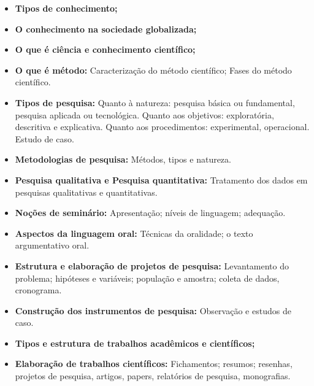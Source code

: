 \begin{itemize}

\item \textbf{Tipos de conhecimento;}

\item \textbf{O conhecimento na sociedade globalizada;}

\item \textbf{O que é ciência e conhecimento científico;}

\item \textbf{O que é método:} 
Caracterização do método científico; Fases do método científico.

\item \textbf{Tipos de pesquisa:}
Quanto à natureza: pesquisa básica ou fundamental, pesquisa aplicada ou tecnológica. Quanto aos objetivos: exploratória, descritiva e explicativa. Quanto aos procedimentos: experimental, operacional. Estudo de caso.

\item \textbf{Metodologias de pesquisa:}
Métodos, tipos e natureza.

\item \textbf{Pesquisa qualitativa e Pesquisa quantitativa:}
Tratamento dos dados em pesquisas qualitativas e quantitativas.

\item \textbf{Noções de seminário:}
Apresentação; níveis de linguagem; adequação.

\item \textbf{Aspectos da linguagem oral:}
Técnicas da oralidade; o texto argumentativo oral.

\item \textbf{Estrutura e elaboração de projetos de pesquisa:}
Levantamento do problema; hipóteses e variáveis; população e amostra; coleta de dados, cronograma.

\item \textbf{Construção dos instrumentos de pesquisa:}
Observação e estudos de caso.

\item \textbf{Tipos e estrutura de trabalhos acadêmicos e científicos;}

\item \textbf{Elaboração de trabalhos científicos:}
Fichamentos; resumos; resenhas, projetos de pesquisa, artigos, papers, relatórios de pesquisa, monografias.

\end{itemize}


